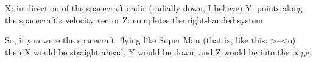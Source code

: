 
X: in direction of the spacecraft nadir (radially down, I believe)
Y: points along the spacecraft's velocity vector
Z: completes the right-handed system


So, if you were the spacecraft, flying like Super Man (that is, like
this:  >--<o), then X would be straight ahead, Y would be down, and Z
would be into the page.
